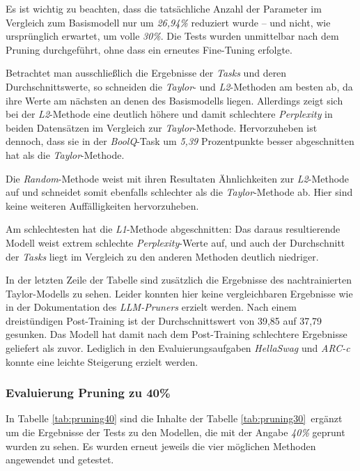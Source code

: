 Es ist wichtig zu beachten, dass die tatsächliche Anzahl der Parameter im
Vergleich zum Basismodell nur um \emph{26,94\%} reduziert wurde – und nicht, wie
ursprünglich erwartet, um volle \emph{30\%}. Die Tests wurden unmittelbar nach
dem Pruning durchgeführt, ohne dass ein erneutes Fine-Tuning erfolgte.

Betrachtet man ausschließlich die Ergebnisse der \emph{Tasks} und deren
Durchschnittswerte, so schneiden die \emph{Taylor}- und \emph{L2}-Methoden am
besten ab, da ihre Werte am nächsten an denen des Basismodells liegen.
Allerdings zeigt sich bei der \emph{L2}-Methode eine deutlich höhere und damit
schlechtere \emph{Perplexity} in beiden Datensätzen im Vergleich zur
\emph{Taylor}-Methode. Hervorzuheben ist dennoch, dass sie in der
\emph{BoolQ}-Task um \emph{5,39} Prozentpunkte besser abgeschnitten hat als die
\emph{Taylor}-Methode.

Die \emph{Random}-Methode weist mit ihren Resultaten Ähnlichkeiten zur
\emph{L2}-Methode auf und schneidet somit ebenfalls schlechter als die
\emph{Taylor}-Methode ab. Hier sind keine weiteren Auffälligkeiten
hervorzuheben.

Am schlechtesten hat die \emph{L1}-Methode abgeschnitten: Das daraus
resultierende Modell weist extrem schlechte \emph{Perplexity}-Werte auf, und
auch der Durchschnitt der \emph{Tasks} liegt im Vergleich zu den anderen
Methoden deutlich niedriger.

In der letzten Zeile der Tabelle sind zusätzlich die Ergebnisse des
nachtrainierten Taylor-Modells zu sehen. Leider konnten hier keine
vergleichbaren Ergebnisse wie in der Dokumentation des \emph{LLM-Pruners}
erzielt werden. Nach einem dreistündigen Post-Training ist der Durchschnittswert
von 39,85 auf 37,79 gesunken. Das Modell hat damit nach dem Post-Training
schlechtere Ergebnisse geliefert als zuvor. Lediglich in den
Evaluierungsaufgaben \emph{HellaSwag} und \emph{ARC-c} konnte eine leichte
Steigerung erzielt werden.

\newpage

\subsubsection{Evaluierung Pruning zu 40\%}

In Tabelle \ref{tab:pruning40} sind die Inhalte der Tabelle
\ref{tab:pruning30} ergänzt um die Ergebnisse der Tests zu den Modellen, die mit
der Angabe \emph{40\%} geprunt wurden zu sehen. Es wurden erneut jeweils die
vier möglichen Methoden angewendet und getestet.

